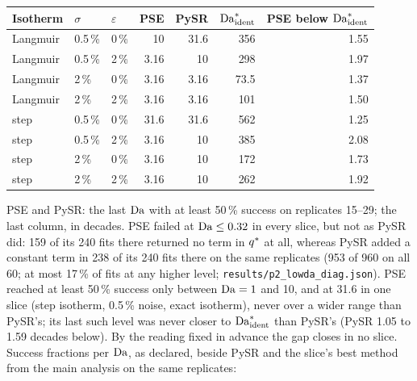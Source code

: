 \begin{center}
\small
\begin{tabular}{lllrrrr}
\toprule
Isotherm & $\sigma$ & $\varepsilon$ & PSE & PySR & $\mathrm{Da}^{*}_{\mathrm{ident}}$ & PSE below $\mathrm{Da}^{*}_{\mathrm{ident}}$ \\
\midrule
Langmuir & 0.5\,\% & 0\,\% & 10 & 31.6 & 356 & 1.55 \\
Langmuir & 0.5\,\% & 2\,\% & 3.16 & 10 & 298 & 1.97 \\
Langmuir & 2\,\% & 0\,\% & 3.16 & 3.16 & 73.5 & 1.37 \\
Langmuir & 2\,\% & 2\,\% & 3.16 & 3.16 & 101 & 1.50 \\
step & 0.5\,\% & 0\,\% & 31.6 & 31.6 & 562 & 1.25 \\
step & 0.5\,\% & 2\,\% & 3.16 & 10 & 385 & 2.08 \\
step & 2\,\% & 0\,\% & 3.16 & 10 & 172 & 1.73 \\
step & 2\,\% & 2\,\% & 3.16 & 10 & 262 & 1.92 \\
\bottomrule
\end{tabular}
\end{center}
PSE and PySR: the last $\mathrm{Da}$ with at least 50\,\% success on replicates 15--29; the last column, in decades.
PSE failed at $\mathrm{Da} \le 0.32$ in every slice, but not as PySR did: 159 of its 240 fits there
returned no term in $q^{*}$ at all, whereas PySR added a constant term in 238 of its 240 fits there on the same replicates
(953 of 960 on all 60; at most 17\,\% of fits at any higher level; \texttt{results/p2\_lowda\_diag.json}). PSE reached at least 50\,\% success only between $\mathrm{Da} = 1$ and
10, and at 31.6 in one slice (step isotherm, 0.5\,\% noise, exact isotherm), never over a wider range than
PySR's; its last such level was never closer to $\mathrm{Da}^{*}_{\mathrm{ident}}$ than PySR's (PySR 1.05 to 1.59
decades below). By the reading fixed in advance the gap closes in no slice. Success fractions per $\mathrm{Da}$, as
declared, beside PySR and the slice's best method from the main analysis on the same replicates:


